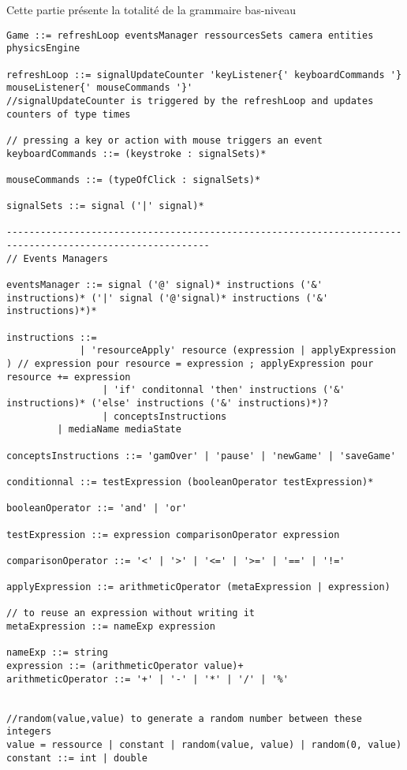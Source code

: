 Cette partie présente la totalité de la grammaire bas-niveau

\begin{lstlisting}[language=Grammar]
 Game ::= refreshLoop eventsManager ressourcesSets camera entities physicsEngine

refreshLoop ::= signalUpdateCounter 'keyListener{' keyboardCommands '} mouseListener{' mouseCommands '}'
//signalUpdateCounter is triggered by the refreshLoop and updates counters of type times

// pressing a key or action with mouse triggers an event
keyboardCommands ::= (keystroke : signalSets)*

mouseCommands ::= (typeOfClick : signalSets)*

signalSets ::= signal ('|' signal)*

----------------------------------------------------------------------------------------------------------
// Events Managers

eventsManager ::= signal ('@' signal)* instructions ('&' instructions)* ('|' signal ('@'signal)* instructions ('&' instructions)*)*

instructions ::= 
	         | 'resourceApply' resource (expression | applyExpression ) // expression pour resource = expression ; applyExpression pour resource += expression
                 | 'if' conditonnal 'then' instructions ('&' instructions)* ('else' instructions ('&' instructions)*)? 
                 | conceptsInstructions
		 | mediaName mediaState

conceptsInstructions ::= 'gamOver' | 'pause' | 'newGame' | 'saveGame'

conditionnal ::= testExpression (booleanOperator testExpression)*

booleanOperator ::= 'and' | 'or'

testExpression ::= expression comparisonOperator expression

comparisonOperator ::= '<' | '>' | '<=' | '>=' | '==' | '!='

applyExpression ::= arithmeticOperator (metaExpression | expression)

// to reuse an expression without writing it
metaExpression ::= nameExp expression

nameExp ::= string
expression ::= (arithmeticOperator value)+
arithmeticOperator ::= '+' | '-' | '*' | '/' | '%'


//random(value,value) to generate a random number between these integers
value = ressource | constant | random(value, value) | random(0, value)
constant ::= int | double


\end{lstlisting}
